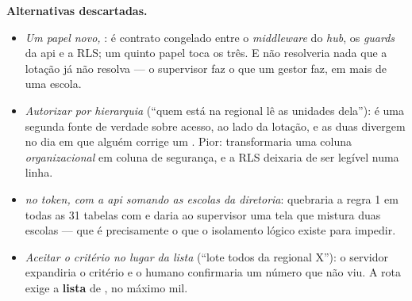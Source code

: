 \textbf{Alternativas descartadas.}
\begin{itemize}
  \item \emph{Um papel novo, }:  é contrato congelado
    entre o \emph{middleware} do \emph{hub}, os \emph{guards} da api e a RLS; um
    quinto papel toca os três. E não resolveria nada que a lotação já não
    resolva --- o supervisor faz o que um gestor faz, em mais de uma escola.
  \item \emph{Autorizar por hierarquia} (\enquote{quem está na regional lê as
    unidades dela}): é uma segunda fonte de verdade sobre acesso, ao lado da
    lotação, e as duas divergem no dia em que alguém corrige um .
    Pior: transformaria uma coluna \emph{organizacional} em coluna de segurança,
    e a RLS deixaria de ser legível numa linha.
  \item \emph{ no \emph{token}, com a api somando as escolas
    da diretoria}: quebraria a regra 1 em todas as 31 tabelas com 
    e daria ao supervisor uma tela que mistura duas escolas --- que é
    precisamente o que o isolamento lógico existe para impedir.
  \item \emph{Aceitar o critério no lugar da lista} (\enquote{lote todos da
    regional X}): o servidor expandiria o critério e o humano confirmaria um
    número que não viu. A rota exige a \textbf{lista} de , no
    máximo mil.
\end{itemize}


